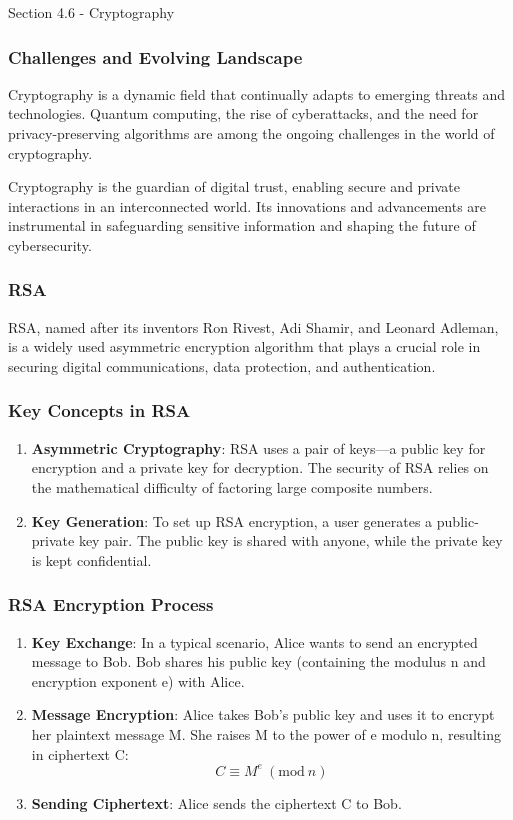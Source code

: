 \begin{notes}{Section 4.6 - Cryptography}
    \subsubsection*{Challenges and Evolving Landscape}
    
    Cryptography is a dynamic field that continually adapts to emerging threats and technologies. Quantum computing, the rise of cyberattacks, and the need for privacy-preserving algorithms are among 
    the ongoing challenges in the world of cryptography.
    
    Cryptography is the guardian of digital trust, enabling secure and private interactions in an interconnected world. Its innovations and advancements are instrumental in safeguarding sensitive 
    information and shaping the future of cybersecurity.

    \subsubsection*{RSA}

    RSA, named after its inventors Ron Rivest, Adi Shamir, and Leonard Adleman, is a widely used asymmetric encryption algorithm that plays a crucial role in securing digital communications, 
    data protection, and authentication.
    
    \subsubsection*{Key Concepts in RSA}

    \begin{enumerate}
        \item \textbf{Asymmetric Cryptography}: RSA uses a pair of keys—a public key for encryption and a private key for decryption. The security of RSA relies on the mathematical difficulty of 
        factoring large composite numbers.
        \item \textbf{Key Generation}: To set up RSA encryption, a user generates a public-private key pair. The public key is shared with anyone, while the private key is kept confidential.
    \end{enumerate}
    
    \subsubsection*{RSA Encryption Process}

    \begin{enumerate}
        \item \textbf{Key Exchange}: In a typical scenario, Alice wants to send an encrypted message to Bob. Bob shares his public key (containing the modulus n and encryption exponent e) 
        with Alice.
        \item \textbf{Message Encryption}: Alice takes Bob's public key and uses it to encrypt her plaintext message M. She raises M to the power of e modulo n, resulting in ciphertext C: 
        \[C \equiv M^e \ (\text{mod} \ n)\]
        \item \textbf{Sending Ciphertext}: Alice sends the ciphertext C to Bob.
    \end{enumerate}
    

\end{notes}
